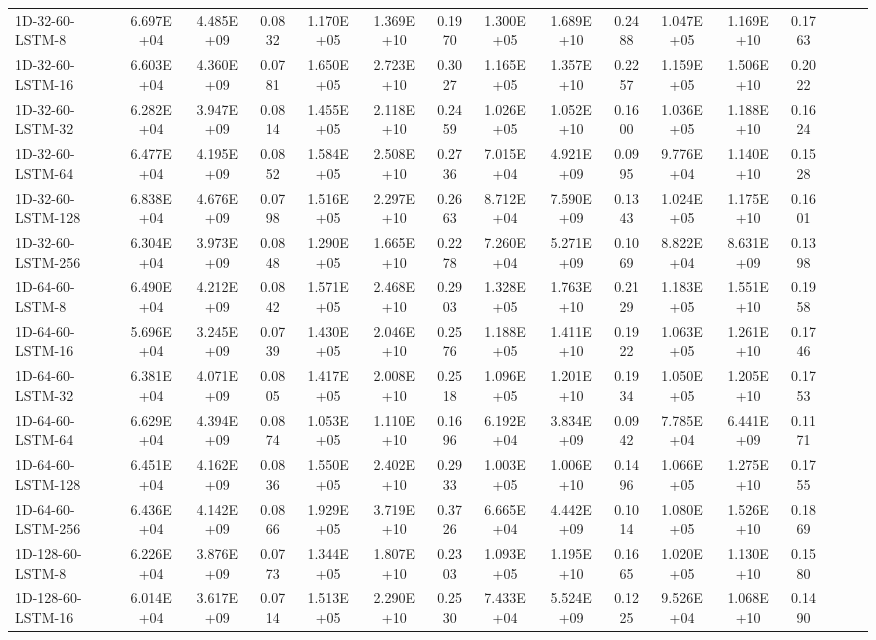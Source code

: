 \begin{landscape}
\begin{longtable}{|l|c|c|c|c|c|c|c|c|c|c|c|c|c|c|c|}
    1D-32-60-LSTM-8 & 6.697E+04 & 4.485E+09 & 0.0832 & 1.170E+05 & 1.369E+10 & 0.1970 & 1.300E+05 & 1.689E+10 & 0.2488 & 1.047E+05 & 1.169E+10 & 0.1763 \\
    1D-32-60-LSTM-16 & 6.603E+04 & 4.360E+09 & 0.0781 & 1.650E+05 & 2.723E+10 & 0.3027 & 1.165E+05 & 1.357E+10 & 0.2257 & 1.159E+05 & 1.506E+10 & 0.2022 \\
    1D-32-60-LSTM-32 & 6.282E+04 & 3.947E+09 & 0.0814 & 1.455E+05 & 2.118E+10 & 0.2459 & 1.026E+05 & 1.052E+10 & 0.1600 & 1.036E+05 & 1.188E+10 & 0.1624 \\
    1D-32-60-LSTM-64 & 6.477E+04 & 4.195E+09 & 0.0852 & 1.584E+05 & 2.508E+10 & 0.2736 & 7.015E+04 & 4.921E+09 & 0.0995 & 9.776E+04 & 1.140E+10 & 0.1528 \\
    1D-32-60-LSTM-128 & 6.838E+04 & 4.676E+09 & 0.0798 & 1.516E+05 & 2.297E+10 & 0.2663 & 8.712E+04 & 7.590E+09 & 0.1343 & 1.024E+05 & 1.175E+10 & 0.1601 \\
    1D-32-60-LSTM-256 & 6.304E+04 & 3.973E+09 & 0.0848 & 1.290E+05 & 1.665E+10 & 0.2278 & 7.260E+04 & 5.271E+09 & 0.1069 & 8.822E+04 & 8.631E+09 & 0.1398 \\
    1D-64-60-LSTM-8 & 6.490E+04 & 4.212E+09 & 0.0842 & 1.571E+05 & 2.468E+10 & 0.2903 & 1.328E+05 & 1.763E+10 & 0.2129 & 1.183E+05 & 1.551E+10 & 0.1958 \\
    1D-64-60-LSTM-16 & 5.696E+04 & 3.245E+09 & 0.0739 & 1.430E+05 & 2.046E+10 & 0.2576 & 1.188E+05 & 1.411E+10 & 0.1922 & 1.063E+05 & 1.261E+10 & 0.1746 \\
    1D-64-60-LSTM-32 & 6.381E+04 & 4.071E+09 & 0.0805 & 1.417E+05 & 2.008E+10 & 0.2518 & 1.096E+05 & 1.201E+10 & 0.1934 & 1.050E+05 & 1.205E+10 & 0.1753 \\
    1D-64-60-LSTM-64 & 6.629E+04 & 4.394E+09 & 0.0874 & 1.053E+05 & 1.110E+10 & 0.1696 & 6.192E+04 & 3.834E+09 & 0.0942 & 7.785E+04 & 6.441E+09 & 0.1171 \\
    1D-64-60-LSTM-128 & 6.451E+04 & 4.162E+09 & 0.0836 & 1.550E+05 & 2.402E+10 & 0.2933 & 1.003E+05 & 1.006E+10 & 0.1496 & 1.066E+05 & 1.275E+10 & 0.1755 \\
    1D-64-60-LSTM-256 & 6.436E+04 & 4.142E+09 & 0.0866 & 1.929E+05 & 3.719E+10 & 0.3726 & 6.665E+04 & 4.442E+09 & 0.1014 & 1.080E+05 & 1.526E+10 & 0.1869 \\
    1D-128-60-LSTM-8 & 6.226E+04 & 3.876E+09 & 0.0773 & 1.344E+05 & 1.807E+10 & 0.2303 & 1.093E+05 & 1.195E+10 & 0.1665 & 1.020E+05 & 1.130E+10 & 0.1580 \\
    1D-128-60-LSTM-16 & 6.014E+04 & 3.617E+09 & 0.0714 & 1.513E+05 & 2.290E+10 & 0.2530 & 7.433E+04 & 5.524E+09 & 0.1225 & 9.526E+04 & 1.068E+10 & 0.1490 \\

\end{longtable}
\end{landscape}
